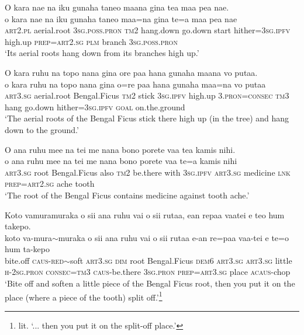 \ea\label{ex:text7-84}
O kara nae na iku gunaha taneo maana gina tea maa pea nae.\\
\gll o	kara	nae	na	iku	gunaha	taneo	maa=na	gina	te=a	maa	pea	nae\\
     \textsc{art}2.\textsc{pl}	aerial.root	3\textsc{sg}.\textsc{poss}.\textsc{pron}	\textsc{tm}2	hang.down	go.down	start	hither=3\textsc{sg}.\textsc{ipfv}	high.up	\textsc{prep}=\textsc{art}2.\textsc{sg}	\textsc{plm}	branch	3\textsc{sg}.\textsc{poss}.\textsc{pron}\\
\glt `Its aerial roots hang down from its branches high up.'
\z

\ea\label{ex:text7-85}
O kara ruhu na topo nana gina ore paa hana gunaha maana vo putaa.\\
\gll o	kara	ruhu	na	topo	nana	gina	o=re	paa	hana	gunaha	maa=na	vo	putaa\\
     \textsc{art}3.\textsc{sg}	aerial.root	Bengal.Ficus	\textsc{tm}2	stick	3\textsc{sg}.\textsc{ipfv}	high.up	3.\textsc{pron}=\textsc{consec}	\textsc{tm}3	hang	go.down	hither=3\textsc{sg}.\textsc{ipfv}	\textsc{goal}	on.the.ground\\
\glt `The aerial roots of the Bengal Ficus stick there high up (in the tree) and hang down to the ground.'
\z

\ea\label{ex:text7-86}
O ana ruhu mee na tei me nana bono porete vaa tea kamis nihi.\\
\gll o	ana	ruhu	mee	na	tei	me	nana	bono	porete	vaa	te=a	kamis	nihi\\
     \textsc{art}3.\textsc{sg}	root	Bengal.Ficus	also	\textsc{tm}2	be.there	with	3\textsc{sg}.\textsc{ipfv}	\textsc{art}3.\textsc{sg}	medicine	\textsc{lnk}	\textsc{prep}=\textsc{art}2.\textsc{sg}	ache	tooth\\
\glt `The root of the Bengal Ficus contains medicine against tooth ache.'
\z

\ea\label{ex:text7-87}
Koto vamuramuraka o sii ana ruhu vai o sii rutaa, ean repaa vaatei e teo hum takepo.\\
\gll koto	va-mura{$\sim$}muraka	o	sii	ana	ruhu	vai	o	sii	rutaa	e-an	re=paa	vaa-tei	e	te=o	hum	ta-kepo\\
     bite.off	\textsc{caus}-\textsc{red}{$\sim$}soft	\textsc{art}3.\textsc{sg}	\textsc{dim}	root	Bengal.Ficus	\textsc{dem}6	\textsc{art}3.\textsc{sg}	\textsc{art}3.\textsc{sg}	little	\textsc{h}-2\textsc{sg}.\textsc{pron}	\textsc{consec}=\textsc{tm}3	\textsc{caus}-be.there	3\textsc{sg}.\textsc{pron}	\textsc{prep}=\textsc{art}3.\textsc{sg}	place	\textsc{acaus}-chop\\
\glt `Bite off and soften a little piece of the Bengal Ficus root, then you put it on the place (where a piece of the tooth) split off.'\footnote{lit. `... then you put it on the split-off place.'}
\z

